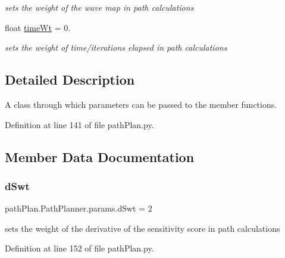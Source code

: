 \begin{DoxyCompactItemize}
\begin{DoxyCompactList}\small\item\em sets the weight of the wave map in path calculations \end{DoxyCompactList}\item 
float \mbox{\hyperlink{classpath_plan_1_1_path_planner_1_1params_aca35113628a0f6ca96f5a1d576e74203}{time\+Wt}} = 0.
\begin{DoxyCompactList}\small\item\em sets the weight of time/iterations elapsed in path calculations \end{DoxyCompactList}\end{DoxyCompactItemize}


\subsection{Detailed Description}
A class through which parameters can be passed to the member functions. 

Definition at line 141 of file path\+Plan.\+py.



\subsection{Member Data Documentation}
\mbox{\label{classpath_plan_1_1_path_planner_1_1params_a610fb5e919a89498e435fded5291dc1a}} 
\subsubsection{\texorpdfstring{d\+Swt}{dSwt}}
{\footnotesize\ttfamily path\+Plan.\+Path\+Planner.\+params.\+d\+Swt = 2\hspace{0.3cm}{\ttfamily [static]}}



sets the weight of the derivative of the sensitivity score in path calculations 



Definition at line 152 of file path\+Plan.\+py.

\mbox{\label{classpath_plan_1_1_path_planner_1_1params_a839dcb73ab2c3b44e4b2f66d9134bfe7}} 
